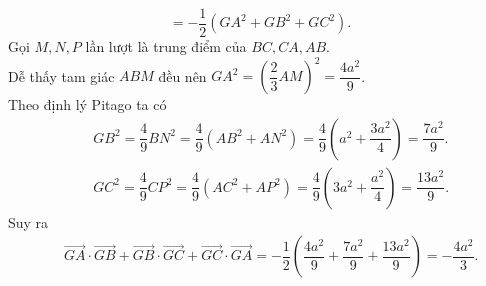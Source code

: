 \begin{bt}
{\begin{enumerate}
$$				=-\dfrac{1}{2}\left(GA^2+GB^2+GC^2\right).$$
			Gọi $M,N,P$ lần lượt là trung điểm của $BC,CA,AB$.\\
			Dễ thấy tam giác $ABM$ đều nên $GA^2=\left(\dfrac{2}{3}AM\right)^2=\dfrac{4a^2}{9}$.\\
			Theo định lý Pitago ta có
			\begin{eqnarray*}
				&&GB^2=\dfrac{4}{9}BN^2=\dfrac{4}{9}\left(AB^2+AN^2\right)=\dfrac{4}{9}\left(a^2+\dfrac{3a^2}{4}\right)=\dfrac{7a^2}{9}.\\
				&&	GC^2=\dfrac{4}{9}CP^2=\dfrac{4}{9}\left(AC^2+AP^2\right)=\dfrac{4}{9}\left(3a^2+\dfrac{a^2}{4}\right)=\dfrac{13a^2}{9}.
			\end{eqnarray*}
			Suy ra
			\begin{eqnarray*}
				&&	\overrightarrow{GA}\cdot\overrightarrow{GB}+\overrightarrow{GB}\cdot\overrightarrow{GC}+\overrightarrow{GC}\cdot\overrightarrow{GA}=-\dfrac{1}{2}(\dfrac{4a^2}{9}+\dfrac{7a^2}{9}+\dfrac{13a^2}{9})=-\dfrac{4a^2}{3}.
			\end{eqnarray*} 
		\end{enumerate}
	}
\end{bt}

